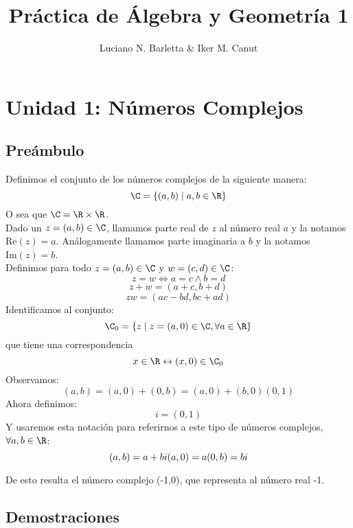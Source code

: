 \documentclass[10pt]{article}
\author{Luciano N. Barletta \& Iker M. Canut}
\begin{document}
\title{Práctica de Álgebra y Geometría 1}
\maketitle
\date
\newpage

\tableofcontents
\newpage

\section{Unidad 1: Números Complejos}

\subsection{Preámbulo}

Definimos el conjunto de los números complejos de la siguiente manera:
$$\C = \{(a,b) \mid a,b \in \R \}$$
O sea que $\C = \R \times \R$.\\
Dado un $z = (a,b) \in \C$, llamamos parte real de $z$ al número real $a$ y la notamos $\textrm{Re}(z) = a$. Análogamente llamamos parte imaginaria a $b$ y la notamos $\textrm{Im}(z) = b$.\\
Definimos para todo $z=(a,b) \in \C$ y $w=(c,d) \in \C$:
$$z=w \Leftrightarrow a=c \land b=d$$
$$z+w = (a+c,b+d)$$
$$zw = (ac-bd,bc+ad)$$
Identificamos al conjunto:
$$\C_0 = \{ z \mid z = (a,0) \in \C, \forall a \in \R \}$$
que tiene una correspondencia
$$x \in \R \leftrightarrow (x,0) \in \C_0$$
Observamos:
$$(a,b) = (a,0)+(0,b) = (a,0)+(b,0)(0,1)$$
Ahora definimos:
$$i = (0,1)$$
Y usaremos esta notación para referirnos a este tipo de números complejos, $\forall a,b \in \R$:
$$
(a,b) = a+bi\\
(a,0) = a\\
(0,b) = bi\\
$$
\begin{prf}[$i^2 = -1$]{}
De esto resulta el número complejo (-1,0), que representa al número real -1.
\end{prf}

\subsection{Demostraciones}

\begin{prf}{}
\end{prf}
\end{document}

